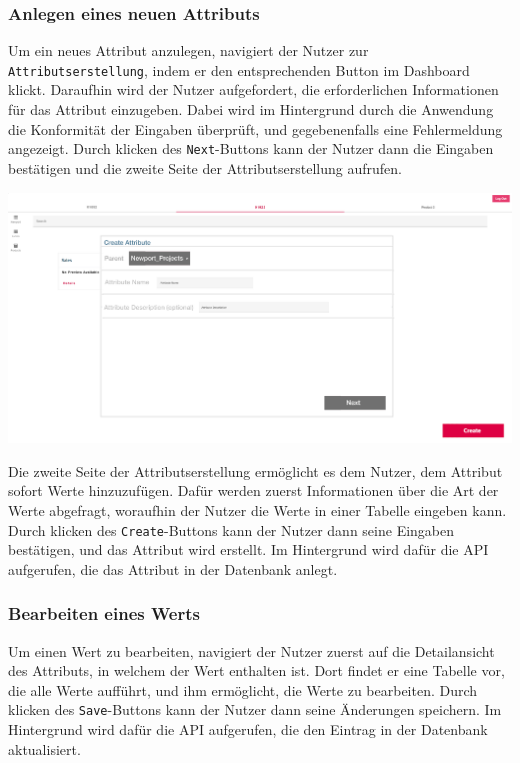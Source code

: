 \subsubsection{Anlegen eines neuen Attributs}
Um ein neues Attribut anzulegen, navigiert der Nutzer zur \texttt{Attributserstellung}, indem er den entsprechenden Button im Dashboard klickt. 
Daraufhin wird der Nutzer aufgefordert, die erforderlichen Informationen für das Attribut einzugeben. Dabei wird im Hintergrund durch die Anwendung 
die Konformität der Eingaben überprüft, und gegebenenfalls eine Fehlermeldung angezeigt. Durch klicken des \texttt{Next}-Buttons kann der Nutzer dann
die Eingaben bestätigen und die zweite Seite der Attributserstellung aufrufen.
\begin{center}
    \includegraphics[width=\linewidth]{./img/attributKreation1.png}
\end{center}

Die zweite Seite der Attributserstellung ermöglicht es dem Nutzer, dem Attribut sofort Werte hinzuzufügen. Dafür werden zuerst Informationen über die Art der Werte 
abgefragt, woraufhin der Nutzer die Werte in einer Tabelle eingeben kann. Durch klicken des \texttt{Create}-Buttons kann der Nutzer dann seine Eingaben bestätigen,
und das Attribut wird erstellt. Im Hintergrund wird dafür die API aufgerufen, die das Attribut in der Datenbank anlegt. 

\subsubsection{Bearbeiten eines Werts}
Um einen Wert zu bearbeiten, navigiert der Nutzer zuerst auf die Detailansicht des Attributs, in welchem der Wert enthalten ist. Dort findet er eine Tabelle vor, 
die alle Werte aufführt, und ihm ermöglicht, die Werte zu bearbeiten. Durch klicken des \texttt{Save}-Buttons kann der Nutzer dann seine Änderungen speichern. Im 
Hintergrund wird dafür die API aufgerufen, die den Eintrag in der Datenbank aktualisiert. 
